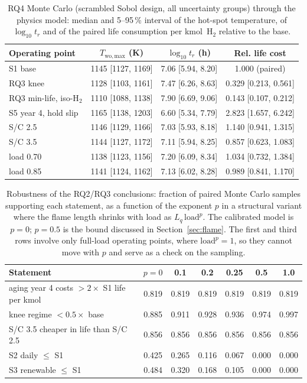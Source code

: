 \documentclass[final,3p,times]{elsarticle}
\begin{document}
\begin{table}[t]
\centering\footnotesize
\caption{RQ4 Monte Carlo (scrambled Sobol design, all uncertainty groups) through the physics model: median and 5--95\,\% interval of the hot-spot temperature, of $\log_{10} t_r$ and of the paired life consumption per kmol~H$_2$ relative to the base.}
\label{tab:uq}
\begin{tabular}{lccc}
\toprule
Operating point & $T_{\mathrm{wo,max}}$ (K) & $\log_{10} t_r$ (h) & Rel. life cost \\
\midrule
S1 base                  & 1145 [1127, 1169] & 7.06 [5.94, 8.20] & 1.000 (paired) \\
RQ3 knee                 & 1128 [1103, 1161] & 7.47 [6.26, 8.63] & 0.329 [0.213, 0.561] \\
RQ3 min-life, iso-H$_2$  & 1110 [1088, 1138] & 7.90 [6.69, 9.06] & 0.143 [0.107, 0.212] \\
S5 year 4, hold slip     & 1165 [1138, 1203] & 6.60 [5.34, 7.79] & 2.823 [1.657, 6.242] \\
S/C 2.5                  & 1146 [1129, 1166] & 7.03 [5.93, 8.18] & 1.140 [0.941, 1.315] \\
S/C 3.5                  & 1144 [1127, 1172] & 7.11 [5.94, 8.25] & 0.857 [0.623, 1.083] \\
load 0.70                & 1138 [1123, 1156] & 7.20 [6.09, 8.34] & 1.034 [0.732, 1.384] \\
load 0.85                & 1141 [1124, 1162] & 7.13 [6.02, 8.28] & 0.989 [0.841, 1.170] \\
\bottomrule
\end{tabular}
\end{table}

\begin{table}[t]
\centering\footnotesize
\caption{Robustness of the RQ2/RQ3 conclusions: fraction of paired Monte Carlo samples
supporting each statement, as a function of the exponent $p$ in a structural variant where
the flame length shrinks with load as $L_q\,\mathrm{load}^{p}$. The calibrated model is
$p = 0$; $p = 0.5$ is the bound discussed in Section~\ref{sec:flame}. The first and third
rows involve only full-load operating points, where $\mathrm{load}^{p} = 1$, so they cannot
move with $p$ and serve as a check on the sampling.}
\label{tab:robust}
\begin{tabular}{lcccccc}
\toprule
Statement & $p = 0$ & 0.1 & 0.2 & 0.25 & 0.5 & 1.0 \\
\midrule
aging year 4 costs $> 2\times$ S1 life per kmol & 0.819 & 0.819 & 0.819 & 0.819 & 0.819 & 0.819 \\
knee regime $< 0.5\times$ base                  & 0.885 & 0.911 & 0.928 & 0.936 & 0.974 & 0.997 \\
S/C 3.5 cheaper in life than S/C 2.5            & 0.856 & 0.856 & 0.856 & 0.856 & 0.856 & 0.856 \\
S2 daily $\leq$ S1                              & 0.425 & 0.265 & 0.116 & 0.067 & 0.000 & 0.000 \\
S3 renewable $\leq$ S1                          & 0.484 & 0.320 & 0.168 & 0.105 & 0.000 & 0.000 \\
\bottomrule
\end{tabular}
\end{table}
\end{document}

